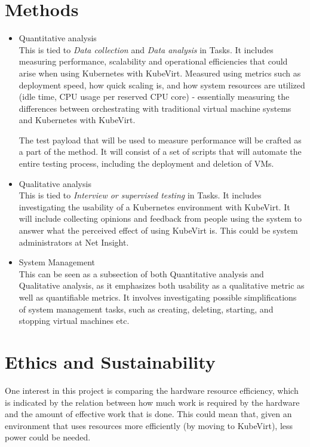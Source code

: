 \documentclass{article}
\begin{document}
\section{Methods}
\begin{itemize}
    \item Quantitative analysis\\
    This is tied to \textit{Data collection} and \textit{Data analysis} in Tasks. It includes measuring performance, scalability and operational efficiencies that could arise when using Kubernetes with KubeVirt. Measured using metrics such as deployment speed, how quick scaling is, and how system resources are utilized (idle time, CPU usage per reserved CPU core) - essentially measuring the differences between orchestrating with traditional virtual machine systems and Kubernetes with KubeVirt. 

    The test payload that will be used to measure performance will be crafted as a part of the method. It will consist of a set of scripts that will automate the entire testing process, including the deployment and deletion of VMs.
    \item Qualitative analysis\\
    This is tied to \textit{Interview or supervised testing} in Tasks. It includes investigating the usability of a Kubernetes environment with KubeVirt. It will include collecting opinions and feedback from people using the system to answer what the perceived effect of using KubeVirt is. This could be system administrators at Net Insight.
    \item System Management\\
    This can be seen as a subsection of both Quantitative analysis and Qualitative analysis, as it emphasizes both usability as a qualitative metric as well as quantifiable metrics. It involves investigating possible simplifications of system management tasks, such as creating, deleting, starting, and stopping virtual machines etc.
\end{itemize}

\section{Ethics and Sustainability}
One interest in this project is comparing the hardware resource efficiency, which is indicated by the relation between how much work is required by the hardware and the amount of effective work that is done. This could mean that, given an environment that uses resources more efficiently (by moving to KubeVirt), less power could be needed.
\end{document}
